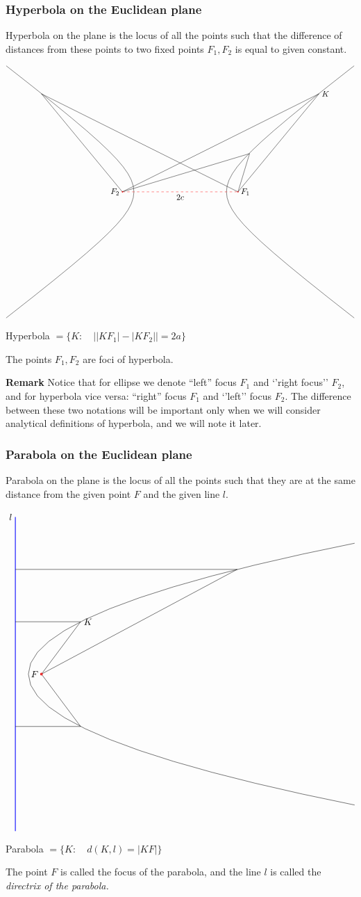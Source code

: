 \documentclass[12pt]{article}
\numberwithin{equation}{section}
\begin{document}
 \subsubsection {Hyperbola on the  Euclidean plane}

 Hyperbola on the plane is the locus of all the points
such that the difference of distances from these points to
two fixed points $F_1,F_2$ is equal to given constant.



\begin{equation}\label{firsthyperbola}
\begin{tikzpicture}[scale=0.5]
    \pgfmathsetmacro{\a}{4}
    \pgfmathsetmacro{\b}{3}
    \draw [domain=-2:2] plot ({\a*cosh(\x)},{\b*sinh(\x)});
   \draw plot[domain=-2:2] ({-\a*cosh(\x)},{\b*sinh(\x)});
\draw  (-5,0)--(12,8.46)--(5,0);
\draw  (-5,0)--(-12,8.46)--(5,0);
\draw  (-5,0)--(6,3.3)--(5,0);
\node [right] at (12, 8.46) {$K$};
\draw [dashed, red] (-5,0) -- (5,0);
\node [below] at (0,0) {$2c$};

\draw[red,thick] (-5,0) circle (1pt); 
\draw[red,thick] (5,0) circle (1pt); 
\node [left] at (-5,0) {$F_2$};
\node [right] at (5,0) {$F_1$};
\end{tikzpicture}
\end{equation}


Hyperbola $=\{K\colon\quad \left||KF_1|-|KF_2|\right|=2a\}$

The points $F_1,F_2$ are foci of hyperbola.
 
{\bf Remark} Notice that for ellipse
we denote 
``left'' focus $F_1$ and `'right focus''
$F_2$, and for hyperbola vice versa:
``right'' focus $F_1$ and `'left''  focus
$F_2$. The difference between these two notations
will be important only
when we will consider analytical definitions of
hyperbola, and we will note it later.

 \subsubsection {Parabola  on the  Euclidean plane}

 Parabola on the plane is the locus of all the points
such that they are at the same distance from the given point
   $F$ and the given line $l$.


\begin{equation}\label{firstparabola}
\begin{tikzpicture}%
    \draw [domain=-5:5] plot ({0.5*\x*\x-5},\x);
\draw [  thick, blue] (-5.5,-6)--(-5.5,6); 
\node [left] at (-5.5,6) {$l$};
\draw  (-5.5,4)--(3,4)--(-4.5,0);
\draw  (-5.5,-2)--(-3,-2)--(-4.5,0);
\draw  (-5.5,2)--(-3,2)--(-4.5,0);
\node [right] at (-3, 2) {$K$};
\draw[red,thick] (-4.5,0) circle (1pt); 
\node [left] at (-4.5,0) {$F$};
\end{tikzpicture}
\end{equation}

\m


Parabola $=\{K\colon\quad d(K,l)=|KF|\}$

\m       

The point $F$ is called the focus of the parabola,
and the line $l$  is called the {\it directrix of the parabola.}


\m
\end{document}
